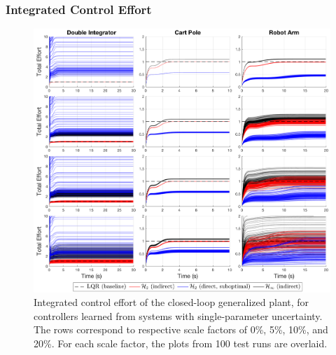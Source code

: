 \subsubsection{Integrated Control Effort}
\begin{figure}[H]
\centering
	\includegraphics[width=\textwidth]{figures/uncertainty_integrated_effort4_s.png}
\caption{Integrated control effort of the closed-loop generalized plant, for controllers learned from systems with single-parameter uncertainty.  The rows correspond to respective scale factors of 0\%, 5\%, 10\%, and 20\%.  For each scale factor, the plots from 100 test runs are overlaid.}
\label{fig:uncertainty_integrated_effort4_s}
\end{figure}

\newpage
